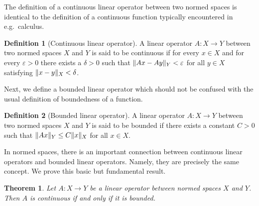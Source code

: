 \documentclass[english, 12pt, a4paper, sci, utf8, a-2b, online]{aaltothesis}
\theoremstyle{definition}
\newtheorem{definition}{Definition}[section]
\theoremstyle{plain}
\newtheorem{theorem}{Theorem}[section]
\DeclarePairedDelimiter\norm{\lVert}{\rVert}
\numberwithin{equation}{section}
\begin{document}
The definition of a continuous linear operator between two normed spaces
is identical to the definition of a continuous function typically encountered
in e.g.\ calculus.
\begin{definition}[Continuous linear operator]
    \label{def:continuousoperator}
    A linear operator $A: X \to Y$ between two normed spaces
    $X$ and $Y$ is said to be continuous
    if for every $x \in X$ and for every $\varepsilon > 0$
    there exists a $\delta > 0$ such that $\norm{Ax - Ay}_Y < \varepsilon$
    for all $y \in X$ satisfying $\norm{x-y}_X < \delta$.
\end{definition}
Next, we define a bounded linear operator which should not be confused
with the usual definition of boundedness of a function.
\begin{definition}[Bounded linear operator]
    \label{def:boundedness}
    A linear operator $A: X \to Y$ between two normed spaces
    $X$ and $Y$ is said to be bounded
    if there exists a constant $C > 0$ such that
    $\norm{Ax}_Y \leq C \norm{x}_X$ for all $x \in X$.
\end{definition}
In normed spaces, there is an important connection between
continuous linear operators and bounded linear operators.
Namely, they are precisely the same concept.
We prove this basic but fundamental result.
\begin{theorem}
    \label{thm:boundedcontinuous}
    Let $A: X \to Y$ be a linear operator between normed spaces $X$ and $Y$.
    Then $A$ is continuous if and only if it is bounded.
\end{theorem}
\end{document}
